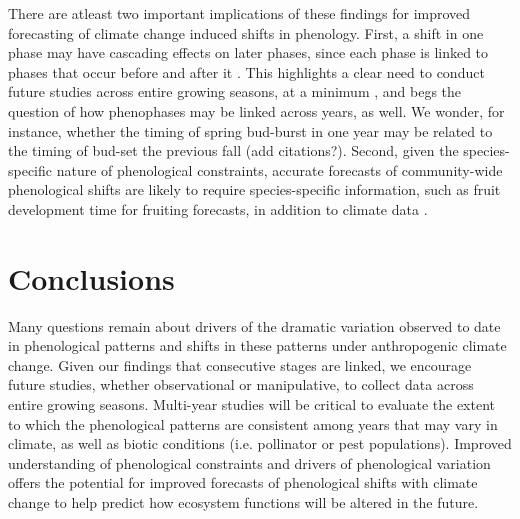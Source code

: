 \documentclass{article}
\begin{document}
\par There are atleast two important implications of these findings for improved forecasting of climate change induced shifts in phenology. First, a shift in one phase may have cascading effects on later phases, since each phase is linked to phases that occur before and after it \citep{wolkovich2014b}. This highlights a clear need to conduct future studies across entire growing seasons, at a minimum    \citep{wolkovich2014}, and begs the question of how phenophases may be linked across years, as well. We wonder, for instance, whether the timing of spring bud-burst in one year may be related to the timing of bud-set the previous fall (add citations?). Second, given the species-specific nature of phenological constraints, accurate forecasts of community-wide phenological shifts are likely to require species-specific information, such as fruit development time for fruiting forecasts, in addition to climate data \citep{diez2012}. %

\section* {Conclusions}
Many questions remain about drivers of the dramatic variation observed to date in phenological patterns and shifts in these patterns under anthropogenic climate change. Given our findings that consecutive stages are linked, we encourage future studies, whether observational or manipulative, to collect data across entire growing seasons. Multi-year studies will be critical to evaluate the extent to which the phenological patterns are consistent among years that may vary in climate, as well as biotic conditions (i.e. pollinator or pest populations).  %
Improved understanding of phenological constraints and drivers of phenological variation offers the potential for improved forecasts of phenological shifts  with climate change to help predict how ecosystem functions will be altered  in the future.
\end{document}

